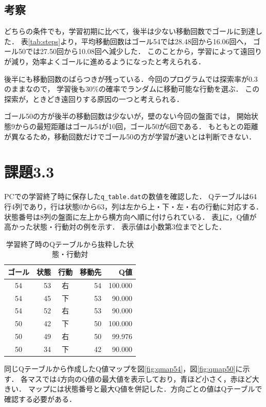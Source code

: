 \documentclass[a4paper,11pt]{ltjsarticle}
\begin{document}
\subsection*{考察}
どちらの条件でも，学習初期に比べて，後半は少ない移動回数でゴールに到達した．
表\ref{tab:steps}より，平均移動回数はゴール54では28.48回から16.06回へ，
ゴール50では27.50回から10.08回へ減少した．
このことから，学習によって遠回りが減り，効率よくゴールに進めるようになったと考えられる．

後半にも移動回数のばらつきが残っている．今回のプログラムでは探索率が0.3のままなので，
学習後も30\%の確率でランダムに移動可能な行動を選ぶ．
この探索が，ときどき遠回りする原因の一つと考えられる．

ゴール50の方が後半の移動回数は少ないが，壁のない今回の盤面では，
開始状態9からの最短距離はゴール54が10回，ゴール50が6回である．
もともとの距離が異なるため，移動回数だけでゴール50の方が学習が速いとは判断できない．

\clearpage
\section*{課題3.3}
PCでの学習終了時に保存した\texttt{q\_table.dat}の数値を確認した．
Qテーブルは64行4列であり，行は状態0から63，列は左から上・下・左・右の行動に対応する．
状態番号は8列の盤面に左上から横方向へ順に付けられている．
表\ref{tab:qvalues}に，Q値が高かった状態・行動対の例を示す．
表示値は小数第3位までとした．

\begin{table}[H]
\centering
\caption{学習終了時のQテーブルから抜粋した状態・行動対}
\label{tab:qvalues}
\begin{tabular}{crcrr}
\hline
ゴール & 状態 & 行動 & 移動先 & Q値 \\
\hline
54 & 53 & 右 & 54 & 100.000 \\
54 & 45 & 下 & 53 & 90.000 \\
54 & 52 & 右 & 53 & 90.000 \\
50 & 42 & 下 & 50 & 100.000 \\
50 & 49 & 右 & 50 & 99.976 \\
50 & 34 & 下 & 42 & 90.000 \\
\hline
\end{tabular}
\end{table}

同じQテーブルから作成したQ値マップを図\ref{fig:qmap54}，図\ref{fig:qmap50}に示す．
各マスでは4方向のQ値の最大値を表示しており，青ほど小さく，赤ほど大きい．
マップには状態番号と最大Q値を併記した．方向ごとの値はQテーブルで確認する必要がある．
\end{document}
